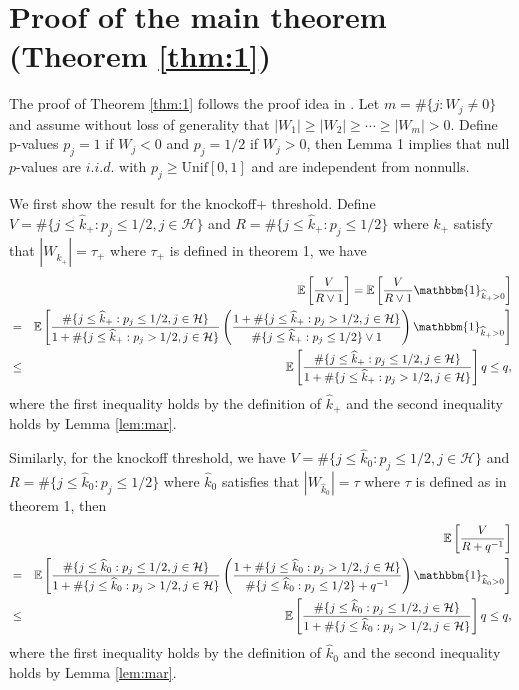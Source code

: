 \documentclass[11pt]{article}
\theoremstyle{plain}
\theoremstyle{definition}
\theoremstyle{remark}
\newcommand{\EE}[1]{\mathbb{E}\left[{#1}\right]} %
\newcommand{\0}{\mathbf{0}}
\begin{document}
\section{Proof of the main theorem (Theorem \ref{thm:1})}
The proof of Theorem \ref{thm:1} follows the proof idea in \cite{barber2015}.
Let $m=\#\{j:W_j\neq 0\}$ and assume without loss of generality that $|W_1|\geq |W_2|\geq\cdots\geq |W_m|>0$. Define p-values $p_j=1$ if $W_j<0$ and $p_j=1/2$ if $W_j>0$, then Lemma 1 implies that null $p$-values are $i.i.d.$ with $p_j\geq \text{Unif}[0,1]$ and are independent from nonnulls. 

We first show the result for the knockoff+ threshold. Define $V=\#\{j\leq \widehat{k}_{+}: p_j\leq 1/2, j\in \mathcal{H}\}$ and $R=\#\{j\leq \widehat{k}_{+}:p_j\leq 1/2\}$ where $\widehat{k}_{+}$ satisfy that $|W_{\widehat{k}_{+}}|=\tau_{+}$ where $\tau_{+}$ is defined in theorem 1, we have
\begin{eqnarray*}
&&\EE{\frac{V}{R\vee 1}}=\EE{\frac{V}{R\vee 1}\mathbbm{1}_{\widehat{k}_{+}>0}}\\
&=&\EE{\frac{\#\{j\leq \widehat{k}_{+}: p_j\leq 1/2, j\in \mathcal{H}\}}{1+\#\{j\leq \widehat{k}_{+}: p_j> 1/2, j\in \mathcal{H}\}}\left(\frac{1+\#\{j\leq \widehat{k}_{+}: p_j> 1/2, j\in \mathcal{H}\}}{\#\{j\leq \widehat{k}_{+}:p_j\leq 1/2\}\vee 1}\right)\mathbbm{1}_{\widehat{k}_{+}>0}}\\
&\leq&\EE{\frac{\#\{j\leq \widehat{k}_{+}: p_j\leq 1/2, j\in \mathcal{H}\}}{1+\#\{ j\leq \widehat{k}_{+}: p_j> 1/2, j\in \mathcal{H}\}}}q\leq q,
\end{eqnarray*}
where the first inequality holds by the definition of $\widehat{k}_{+}$ and the second inequality holds by Lemma \ref{lem:mar}.

Similarly, for the knockoff threshold, we have $V=\#\{j\leq \widehat{k}_0: p_j\leq 1/2, j\in \mathcal{H}\}$ and $R=\#\{j\leq \widehat{k}_0:p_j\leq 1/2\}$ where $\widehat{k}_0$ satisfies that $|W_{\widehat{k}_0}|=\tau$ where $\tau$ is defined as in theorem 1, then
\begin{eqnarray*}
&& \EE{\frac{V}{R+q^{-1}}}\\
&=&\EE{\frac{\#\{ j\leq \widehat{k}_0: p_j\leq 1/2, j\in \mathcal{H}\}}{1+\#\{j\leq \widehat{k}_0: p_j> 1/2, j\in \mathcal{H}\}}\left(\frac{1+\#\{ j\leq \widehat{k}_0: p_j> 1/2, j\in \mathcal{H}\}}{\#\{j\leq \widehat{k}_0:p_j\leq 1/2\}+q^{-1}}\right)\mathbbm{1}_{\widehat{k}_0>0}}\\
&\leq&\EE{\frac{\#\{j\leq \widehat{k}_0: p_j\leq 1/2, j\in \mathcal{H}\}}{1+\#\{ j\leq \widehat{k}_0: p_j> 1/2, j\in \mathcal{H}\}}}q\leq q,
\end{eqnarray*}
where the first inequality holds by the definition of $\widehat{k}_0$ and the second inequality holds by Lemma \ref{lem:mar}.
\end{document}

